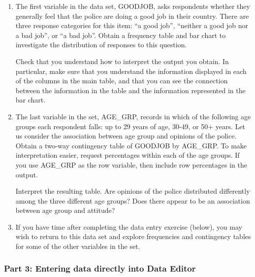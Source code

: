 \begin{enumerate}
\item
The first variable in the data set, GOODJOB, asks respondents whether they generally
feel that the police are doing a good job in their country. There are three response categories for
this item: ``a good job'', ``neither a good job nor a bad job'', or ``a
bad job''.
Obtain a frequency table and bar chart to investigate the distribution of responses to this
question.

Check that you understand how to interpret the output you obtain. In particular,
make sure that you understand the information displayed in each of the columns in the main
table, and that you can see the connection between the information in the table and
the information represented in the bar chart.

\item
The last variable in the set, AGE\_GRP, records in which of the following age groups each
respondent falls: up to 29 years of age, 30-49, or 50+ years.
Let us consider the association between age group and opinions of the police. Obtain a
two-way contingency table of GOODJOB by AGE\_GRP. To make interpretation easier, request
 percentages within each of the age groups. If you use AGE\_GRP as the row variable, then include
 row percentages in the output.

Interpret the resulting table. Are opinions of the police distributed differently among the three
different age groups? Does there appear to be an association between age group and attitude?

\item
If you have time after completing the data entry exercise (below), you may wish to return to
this data set and explore frequencies and contingency tables for some of the other variables in
the set.
\end{enumerate}

\newpage
\subsubsection{Part 3: Entering data directly into Data Editor}

